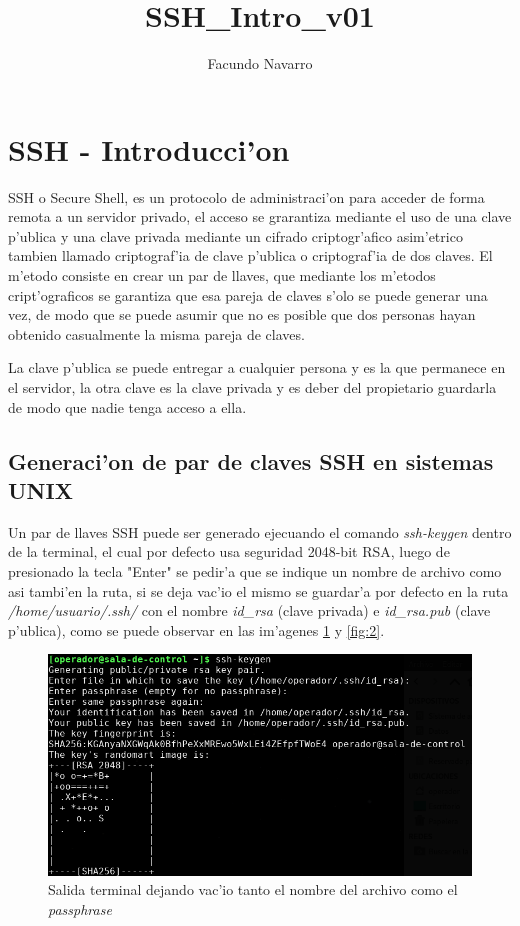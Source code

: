 \documentclass[a4paper]{scrartcl}
\title{SSH\_Intro\_v01}
\author{Facundo Navarro}
\begin{document}

\maketitle
\section{SSH - Introducci'on}
SSH o Secure Shell, es un protocolo de administraci'on para acceder de forma remota a un servidor privado, el acceso se grarantiza mediante el uso de una clave p'ublica y una clave privada mediante un cifrado criptogr'afico asim'etrico tambien llamado criptograf'ia de clave p'ublica o criptograf'ia de dos claves. El m'etodo consiste en crear un par de llaves, que mediante los m'etodos cript'ograficos se garantiza que esa pareja de claves s'olo se puede generar una vez, de modo que se puede asumir que no es posible que dos personas hayan obtenido casualmente la misma pareja de claves.

La clave p'ublica se puede entregar a cualquier persona y es la que permanece en el servidor, la otra clave es la clave privada y es deber del propietario guardarla de modo que nadie tenga acceso a ella.

\subsection{Generaci'on de par de claves SSH en sistemas UNIX}
Un par de llaves SSH puede ser generado ejecuando el comando \textit{ssh-keygen} dentro de la terminal, el cual por defecto usa seguridad 2048-bit RSA, luego de presionado la tecla "Enter" se pedir'a que se indique un nombre de archivo como asi tambi'en la ruta, si se deja vac'io el mismo se guardar'a por defecto en la ruta \textit{/home/usuario/.ssh/} con el nombre \textit{id\_rsa} (clave privada) e \textit{id\_rsa.pub} (clave p'ublica), como se puede observar en las im'agenes {\color{blue}\ref{fig:1}} y {\color{blue}\ref{fig:2}}.

\begin{figure}[ht]
  \includegraphics[width=\columnwidth]{./ssh_intro_imgs/A}
  \caption{Salida terminal dejando vac'io tanto el nombre del archivo como el \textit{passphrase}}
  \label{fig:1}
\end{figure}
\end{document}
